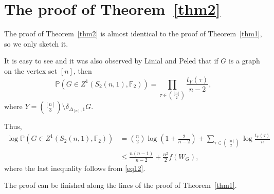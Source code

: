 \documentclass[11pt,a4paper]{article}
\theoremstyle{plain}
\theoremstyle{definition}
\begin{document}
\section{The proof of Theorem~\ref{thm2}}

The proof of Theorem~\ref{thm2} is almost identical to the proof of Theorem~\ref{thm1}, so we only sketch it.

It is easy to see and it was also observed by Linial and Peled \cite[Section 5]{linial2019enumeration} that if $G$ is a graph on the vertex set $[n]$, then
\[\mathbb{P}\left(G\in Z^1(S_2(n,1),\mathbb{F}_2)\right)=\prod_{\tau\in{{[n]}\choose{2}}} \frac{t_Y(\tau)}{n-2},\]
where $Y={{[n]}\choose 3}\setminus\delta_{\Delta_{[n]},1} G$. 

Thus,
\begin{align*}\log \mathbb{P}\left(G\in Z^1(S_2(n,1),\mathbb{F}_2)\right)&={{n}\choose{2}}\log\left(1+\frac{2}{n-2}\right)+\sum_{\tau\in{{[n]}\choose{2}}} \log \frac{t_Y(\tau)}{n}\\&\le \frac{n(n-1)}{n-2}+\frac{n^2}2f(W_G),\end{align*}
where the last inequality follows from \eqref{eq12}.

The proof can be finished along the lines of the proof of Theorem~\ref{thm1}.





\end{document}
